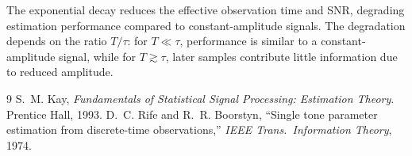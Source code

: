 \documentclass[11pt]{article}
\begin{document}
The exponential decay reduces the effective observation time and SNR, degrading estimation performance compared to constant-amplitude signals. The degradation depends on the ratio $T/\tau$: for $T \ll \tau$, performance is similar to a constant-amplitude signal, while for $T \gtrsim \tau$, later samples contribute little information due to reduced amplitude.

\begin{thebibliography}{9}
S.~M. Kay, \textit{Fundamentals of Statistical Signal Processing: Estimation Theory}. Prentice Hall, 1993.
D.~C. Rife and R.~R. Boorstyn, ``Single tone parameter estimation from discrete-time observations,'' \textit{IEEE Trans.\ Information Theory}, 1974.
\end{thebibliography}
\end{document}
